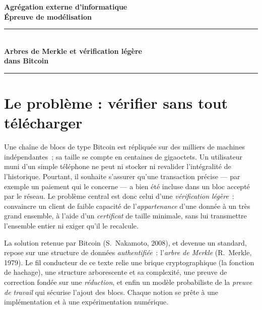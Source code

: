 \documentclass[11pt,a4paper]{article}
\theoremstyle{definition}\newtheorem{definition}{Définition}
\theoremstyle{plain}\newtheorem{theoreme}{Théorème}\newtheorem{proposition}{Proposition}
\theoremstyle{remark}\newtheorem{remarque}{Remarque}
\begin{document}
\begin{center}
{\large\bfseries Agrégation externe d'informatique}\\[3pt]
{\bfseries Épreuve de modélisation}\\[10pt]
\rule{0.85\linewidth}{0.4pt}\\[8pt]
{\LARGE\bfseries Arbres de Merkle et vérification légère\\[2pt] dans Bitcoin}\\[8pt]
\rule{0.85\linewidth}{0.4pt}
\end{center}

\medskip
\begin{center}
\end{center}

\bigskip
\section{Le problème : vérifier sans tout télécharger}

Une chaîne de blocs de type Bitcoin est répliquée sur des milliers de machines indépendantes~;
sa taille se compte en centaines de gigaoctets. Un utilisateur muni d'un simple téléphone ne peut
ni stocker ni revalider l'intégralité de l'historique. Pourtant, il souhaite s'assurer qu'une
transaction précise --- par exemple un paiement qui le concerne --- a bien été incluse dans un
bloc accepté par le réseau. Le problème central est donc celui d'une \emph{vérification légère}~:
convaincre un client de faible capacité de l'\emph{appartenance} d'une donnée à un très grand
ensemble, à l'aide d'un \emph{certificat} de taille minimale, sans lui transmettre l'ensemble
entier ni exiger qu'il le recalcule.

La solution retenue par Bitcoin (S.~Nakamoto, 2008), et devenue un standard, repose sur une
structure de données \emph{authentifiée}~: l'\emph{arbre de Merkle} (R.~Merkle, 1979). Le fil
conducteur de ce texte relie une brique cryptographique (la fonction de hachage), une structure
arborescente et sa complexité, une preuve de correction fondée sur une \emph{réduction}, et enfin
un modèle probabiliste de la \emph{preuve de travail} qui sécurise l'ajout des blocs. Chaque
notion se prête à une implémentation et à une expérimentation numérique.
\end{document}
